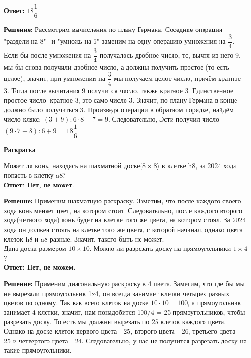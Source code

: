 \textbf{Ответ:} $18\dfrac{1}{6}$\par
\textbf{Решение:} Рассмотрим вычисления по плану Германа. Соседние операции "раздели на 8" \  и "умножь на 6" заменим на одну операцию умножения на $\dfrac{3}{4}$. Если бы после умножения на $\dfrac{3}{4}$ получалось дробное число, то, вычтя из него 9, мы бы снова получили дробное число, а должны получить простое (то есть целое), значит, при умножении на $\dfrac{3}{4}$ мы получаем целое число, причём кратное 3. Тогда после вычитания 9 получится число, также кратное 3. Единственное простое число, кратное 3, это само число 3. Значит, по плану Германа в конце должно было получиться 3. Произведя операции в обратном порядке, найдём число клякс: $(3 + 9) : 6 \cdot 8 - 7 = 9.$ Следовательно, Эсти получил число $(9 \cdot 7 - 8) : 6 + 9$ = $18\dfrac{1}{6}$\\

\begin{flushleft}
  \textbf{\Large Раскраска}
\end{flushleft}


 Может ли конь, находясь на шахматной доске($8 \times 8$) в клетке h8, за 2024 хода попасть в клетку a8?\\

\textbf{Ответ: Нет, не может.}\par
\textbf{Решение:} Применим шахматную раскраску. Заметим, что после каждого своего
\newpage
\noindent хода конь меняет цвет, на котором стоит. Следовательно, после каждого второго хода(четного хода) конь будет на клетке того же цвета, на котором стоял. За 2024 хода он должен стоять на клетке того же цвета, с которой начинал, однако цвета клеток h8 и a8 разные. Значит, такого быть не может.\\

Дана доска размером $10\times10$. Можно ли разрезать доску на прямоугольники $1\times4$?\\

\textbf{Ответ: Нет, не можем.}\par
\textbf{Решение:} Применим диагональную раскраску в 4 цвета. Заметим, что где бы мы не вырезали прямоугольник 1x4, он всегда занимает клетки четырех разных цветов по одному. Так как всего клеток на доске $10\cdot10 = 100$, а прямоугольник занимает 4 клетки, значит, нам понадобится 100/4 = 25 прямоугольников, чтобы разрезать доску. То есть мы должны вырезать по 25 клеток каждого цвета. Однако на доске клеток первого цвета - 25, второго цвета - 26, третьего цвета - 25 и четвертого цвета - 24. Следовательно, у нас не получится разрезать доску на такие прямоугольники.\\
